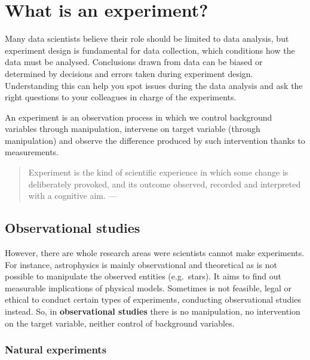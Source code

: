 \documentclass[
]{book}
\begin{document}
\hypertarget{what-is-an-experiment}{%
\section{What is an experiment?}\label{what-is-an-experiment}}

Many data scientists believe their role should be limited to data analysis, but experiment design is fundamental for data collection, which conditions how the data must be analysed. Conclusions drawn from data can be biased or determined by decisions and errors taken during experiment design. Understanding this can help you spot issues during the data analysis and ask the right questions to your colleagues in charge of the experiments.

An experiment is an observation process in which we control background variables through manipulation, intervene on target variable (through manipulation) and observe the difference produced by such intervention thanks to measurements.

\begin{quote}
Experiment is the kind of scientific experience in which some change is deliberately provoked, and its outcome observed, recorded and interpreted with a cognitive aim. --- \citep{bunge2017philosophy}
\end{quote}

\hypertarget{observational-studies}{%
\subsection{Observational studies}\label{observational-studies}}

However, there are whole research areas were scientists cannot make experiments. For instance, astrophysics is mainly observational and theoretical as is not possible to manipulate the observed entities (e.g.~stars). It aims to find out measurable implications of physical models. Sometimes is not feasible, legal or ethical to conduct certain types of experiments, conducting observational studies instead. So, in \textbf{observational studies} there is no manipulation, no intervention on the target variable, neither control of background variables.

\hypertarget{natural-experiments}{%
\subsubsection{Natural experiments}\label{natural-experiments}}
\end{document}

